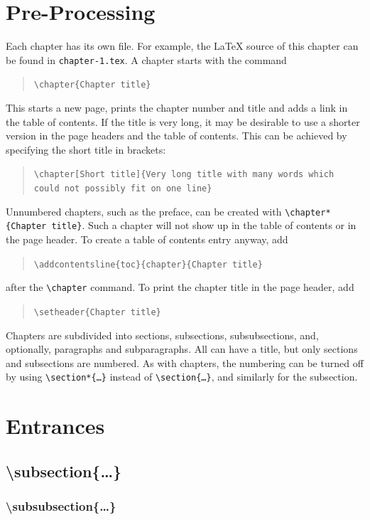 \section{Pre-Processing}

Each chapter has its own file. For example, the \LaTeX{} source of this chapter can be found in \texttt{chapter-1.tex}. A chapter starts with the command
\begin{quote}
    \texttt{\textbackslash chapter\{Chapter title\}}
\end{quote}
This starts a new page, prints the chapter number and title and adds a link in the table of contents. If the title is very long, it may be desirable to use a shorter version in the page headers and the table of contents. This can be achieved by specifying the short title in brackets:
\begin{quote}
    \texttt{\textbackslash chapter[Short title]\{Very long title with many words which could not possibly fit on one line\}}
\end{quote}
Unnumbered chapters, such as the preface, can be created with \texttt{\textbackslash chapter*\{Chapter title\}}. Such a chapter will not show up in the table of contents or in the page header. To create a table of contents entry anyway, add
\begin{quote}
    \texttt{\textbackslash addcontentsline\{toc\}\{chapter\}\{Chapter title\}}
\end{quote}
after the \texttt{\textbackslash chapter} command. To print the chapter title in the page header, add
\begin{quote}
    \texttt{\textbackslash setheader\{Chapter title\}}
\end{quote}

Chapters are subdivided into sections, subsections, subsubsections, and, optionally, paragraphs and subparagraphs. All can have a title, but only sections and subsections are numbered. As with chapters, the numbering can be turned off by using \texttt{\textbackslash section*\{\ldots\}} instead of \texttt{\textbackslash section\{\ldots\}}, and similarly for the subsection.
\section{Entrances}
\subsection{\textbackslash subsection\{\ldots\}}
\subsubsection{\textbackslash subsubsection\{\ldots\}}
